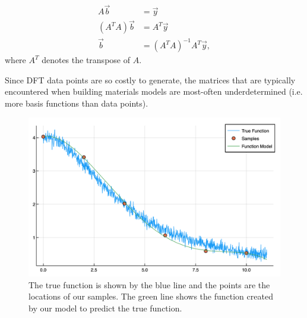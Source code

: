 \begin{align}
A\vec{b} &= \vec{y} \\
(A^TA)\vec{b} &= A^T\vec{y} \\
\vec{b} &= (A^TA)^{-1}A^T\vec{y}, \label{eq:bSolve}
\end{align}
where $A^T$ denotes the transpose of $A$.


Since DFT data points are so costly to generate, the matrices that are typically encountered when building materials models are most-often underdetermined (i.e. more basis functions than data points).


\begin{figure}[h]
\includegraphics[scale = 0.4]{Figures/func1True}
\caption{The true function is shown by the blue line and the points are the locations of our samples. The green line shows the function created by our model to predict the true function.
\label{fig:func1True}} 
\end{figure}



